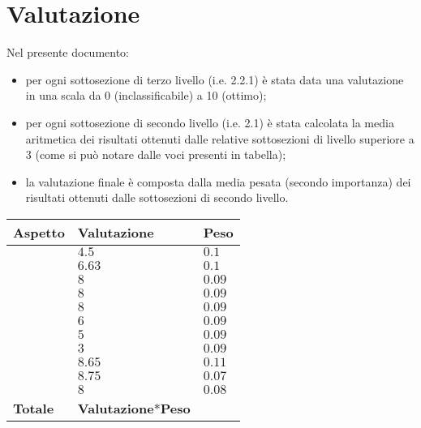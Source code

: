 \section{Valutazione}
Nel presente documento:
\begin{itemize}
	\item per ogni sottosezione di terzo livello (i.e. 2.2.1) 
	è stata data una valutazione in una scala da 0 (inclassificabile) a 10 (ottimo);
	\item per ogni sottosezione di secondo livello (i.e. 2.1) è stata calcolata
	la media aritmetica dei risultati ottenuti dalle relative sottosezioni di livello superiore a 3
	(come si può notare dalle voci presenti in tabella);
	\item la valutazione finale è composta dalla media pesata 
	(secondo importanza) dei risultati ottenuti dalle sottosezioni di secondo 
	livello.
\end{itemize}

\begin{longtable}{| p{5cm} | p{4cm} | l |}

\hline
\hline
\textbf{Aspetto} & \textbf{Valutazione} & \textbf{Peso} \\ 
\hline
\hline

\nameref{sezioni} & $4.5$ & $0.1$ \\%
\hline
\nameref{general} & $ 6.63 $ & $0.1$ \\%
\hline
\nameref{where} & $8$ & $0.09$ \\%
\hline
\nameref{who} & $8$ & $0.09$ \\%
\hline
\nameref{why} & $8$ & $0.09$ \\%
\hline
\nameref{what} & $6$ & $0.09$ \\%
\hline
\nameref{when} & $5$ & $0.09$ \\%
\hline
\nameref{how} & $3$ & $0.09$ \\%
\hline
\nameref{usecase} & $8.65$ & $0.11$ \\%
\hline
\nameref{searchfun} & $8.75$ & $0.07$ \\%
\hline
\nameref{contenuto} &  $8$ & $0.08$ \\%
\hline
\hline
\textbf{Totale} & \textbf{Valutazione$*$Peso} & \textbf{} \\%
\hline
\hline
\end{longtable}
